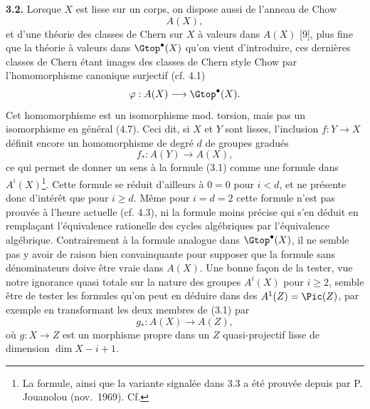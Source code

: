 \textbf{3.2.} Lorsque $X$ est lisse sur un corps, on dispose aussi de l'anneau de Chow
\[
 A(X),
\]
et d'une théorie des classes de Chern sur $X$ à valeurs dans $A(X)$ [9], plus fine que la théorie à valeurs dans $\Gtop^\bullet(X)$ qu'on vient d'introduire, ces dernières classes de Chern étant images des classes de Chern style Chow par l'homomorphisme canonique surjectif (cf. 4.1)
\[
 \varphi:A(X)\longrightarrow \Gtop^\bullet(X).
\]
Cet homomorphisme est un isomorphisme mod. torsion, mais pas un isomorphisme en général (4.7). Ceci dit, si $X$ et $Y$ sont lisses, l'inclusion $f:Y\to X$ définit encore un homomorphisme de degré $d$ de groupes gradués
\[
 f_*:A(Y)\longrightarrow A(X),
\]
ce qui permet de donner un sens à la formule (3.1) comme une formule dans $A^i(X)$\footnote{La formule, ainsi que la variante signalée dans 3.3 a été prouvée depuis par P. Jouanolou (nov.\ 1969). Cf.}. Cette formule se réduit d'ailleurs à $0=0$ pour $i<d$, et ne présente donc d'intérêt que pour $i\geq d$. Même pour $i=d=2$ cette formule n'est pas prouvée à l'heure actuelle (cf. 4.3), ni la formule moins précise qui s'en déduit en remplaçant l'équivalence rationelle des cycles algébriques par l'équivalence algébrique. Contrairement à la formule analogue dans $\Gtop^\bullet(X)$, il ne semble pas y avoir de raison bien convainquante pour supposer que la formule sans dénominateurs doive être vraie dans $A(X)$. Une bonne façon de la tester, vue notre ignorance quasi totale sur la nature des groupes $A^i(X)$ pour $i\geq 2$, semble être de tester les formules qu'on peut en déduire dans des $A^1(Z)=\Pic(Z)$, par exemple en transformant les deux membres de (3.1) par
\[
 g_*:A(X)\longrightarrow A(Z),
\]
où $g:X\to Z$ est un morphisme propre dans un $Z$ quasi-projectif lisse de dimension $\dim X-i+1$.

